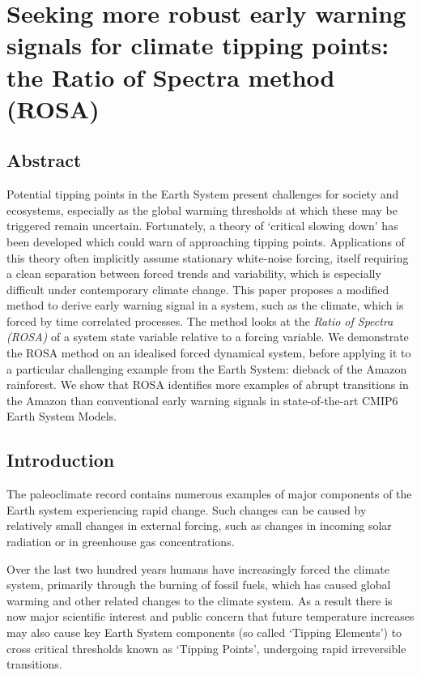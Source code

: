 \chapter{Seeking more robust early warning signals for climate tipping points: the Ratio of Spectra method (ROSA)}
\graphicspath{{ROSA/figs}}


\section{Abstract}
Potential tipping points in the Earth System present challenges for society and 
ecosystems, especially as the global warming thresholds at which these may be triggered remain uncertain. 
Fortunately, a theory of `critical slowing down' has been developed which could warn of approaching tipping points. 
Applications of this theory often implicitly assume stationary white-noise forcing,  itself requiring a clean separation between forced trends and variability, which is especially difficult under contemporary climate change. 
This paper proposes a modified method to derive early warning signal in a 
system, such as the climate, which is forced by time correlated processes. 
The method looks at the \emph{Ratio of Spectra (ROSA)} of a system state variable relative to a forcing variable.   
We demonstrate the ROSA method on an idealised forced dynamical system, before applying it 
to a particular challenging example from the Earth System: dieback of the Amazon rainforest.
We show that ROSA identifies more examples of abrupt transitions in the Amazon than conventional early warning signals in state-of-the-art CMIP6 Earth System Models.


\section{Introduction}\label{sec:introduction}
The paleoclimate record contains numerous examples\cite{Brovkin2021} of 
major components of the Earth system experiencing rapid 
change. Such changes can be caused by 
relatively small changes in external forcing, such as changes in incoming
solar radiation or in greenhouse gas concentrations.

Over the last two hundred years humans have increasingly forced the climate system, 
primarily through the burning of fossil fuels,
which has caused global warming and other related changes to the climate
system. As a result there is now major scientific interest and public 
concern\cite{Lenton2019a,Steffen2018,Ritchie2021}
that future 
temperature increases may also cause key
Earth System components (so called `Tipping Elements')  to cross 
critical thresholds known as `Tipping Points', undergoing rapid 
irreversible transitions\cite{Lenton2008}. 


